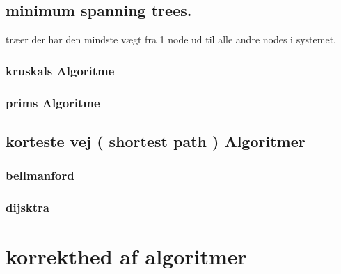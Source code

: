 \documentclass[letterpaper,10pt,danish]{sphinxmanual}
\begin{document}
\sphinxAtStartPar
{}


\subsection{minimum spanning trees.}
\label{\detokenize{Algorithmer/Graphs:minimum-spanning-trees}}
\sphinxAtStartPar
træer der har den mindste vægt fra 1 node ud til alle andre nodes i systemet.


\subsubsection{kruskals Algoritme}
\label{\detokenize{Algorithmer/Graphs:kruskals-algoritme}}
\sphinxAtStartPar
{}


\subsubsection{prims Algoritme}
\label{\detokenize{Algorithmer/Graphs:prims-algoritme}}
\sphinxAtStartPar
{}


\subsection{korteste vej ( shortest path ) Algoritmer}
\label{\detokenize{Algorithmer/Graphs:korteste-vej-shortest-path-algoritmer}}

\subsubsection{bellman\sphinxhyphen{}ford}
\label{\detokenize{Algorithmer/Graphs:bellman-ford}}
\sphinxAtStartPar
{}


\subsubsection{dijsktra}
\label{\detokenize{Algorithmer/Graphs:dijsktra}}
\sphinxAtStartPar
{}

\sphinxstepscope


\section{korrekthed af algoritmer}
\label{\detokenize{Algorithmer/Korrekthed:korrekthed-af-algoritmer}}\label{\detokenize{Algorithmer/Korrekthed::doc}}
\end{document}
